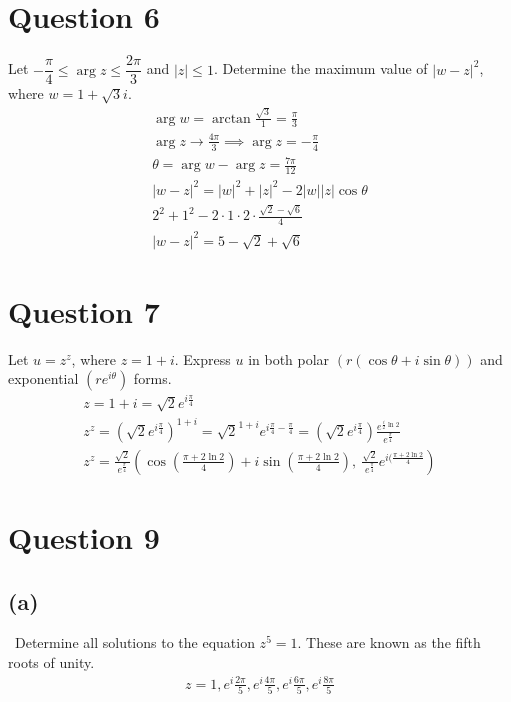 \documentclass[12pt]{article}
\begin{document}
\section{Question 6}
Let $-\dfrac{\pi}{4}\le \arg z \le \dfrac{2\pi}{3}$ and $|z| \le1 $. Determine the maximum value of $|w-z|^2$, where $w=1+\sqrt{3}i$.
\begin{gather*}
    \arg w=\arctan \frac{\sqrt{3}}{1}=\frac{\pi}{3}\\
    \arg z \to \frac{4\pi}{3} \implies \arg z = -\frac{\pi}{4}\\
    \theta =\arg w - \arg z = \frac{7\pi}{12}\\
    |w-z|^2=|w|^2+|z|^2-2|w||z|\cos \theta\\ 2^2+1^2-2\cdot1\cdot2 \cdot  \frac{\sqrt{2}-\sqrt{6}}{4}\\
    \boxed{|w-z|^2=5-\sqrt{2}+\sqrt{6}}
\end{gather*}

\section{Question 7}
Let $u=z^z$, where $z=1+i$. Express $u$ in both polar $(r(\cos \theta + i \sin \theta)) $ and exponential $(re^{i\theta})$ forms. 
\begin{gather*}
    z=1+i=\sqrt{2}e^{i\frac{\pi}{4}}\\
    z^z=(\sqrt{2}e^{i\frac{\pi}{4}})^{1+i}=\sqrt{2}^{1+i}e^{i\frac{\pi}{4}-\frac{\pi}{4}}=(\sqrt{2}e^{i\frac{\pi}{4}})\frac{e^{\frac{i}{2} \ln 2}}{e^{\frac{\pi}{4}}}\\
    z^z=\boxed{\frac{\sqrt{2}}{e^{\frac{\pi}{4}}}(\cos (\frac{\pi+2 \ln 2}{4}) + i\sin (\frac{\pi+2 \ln 2}{4}), \ \frac{\sqrt{2}}{e^{\frac{\pi}{4}}}e^{i(\frac{\pi+2 \ln 2}{4}})}
\end{gather*}

\section{Question 9}
\vspace{0.3em}
\subsection{(a)} \, Determine all solutions to the equation $z^5=1$. These are known as the fifth roots of unity. 
\begin{gather*}
    \boxed{z=1, e^i\frac{2\pi}{5}, e^i\frac{4\pi}{5}, e^i\frac{6\pi}{5},  e^i\frac{8\pi}{5}}
\end{gather*}
\end{document}
